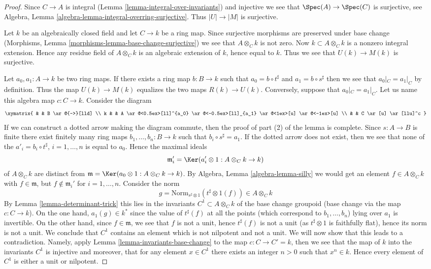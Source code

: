 \begin{proof}
Since $C \to A$ is integral (Lemma \ref{lemma-integral-over-invariants})
and injective we see that $\Spec(A) \to \Spec(C)$ is surjective, see
Algebra, Lemma \ref{algebra-lemma-integral-overring-surjective}.
Thus $|U| \to |M|$ is surjective.

\medskip\noindent
Let $k$ be an algebraically closed field and let $C \to k$ be a ring map.
Since surjective morphisms are preserved under base change
(Morphisms, Lemma \ref{morphisms-lemma-base-change-surjective})
we see that $A \otimes_C k$ is not zero. Now $k \subset A \otimes_C k$ is a
nonzero integral extension. Hence any residue field of $A \otimes_C k$
is an algebraic extension of $k$, hence equal to $k$. Thus we see that
$U(k) \to M(k)$ is surjective.

\medskip\noindent
Let $a_0, a_1 : A \to k$ be two ring maps. If there exists a ring map
$b : B \to k$ such that $a_0 = b \circ t^\sharp$ and $a_1 = b \circ s^\sharp$
then we see that $a_0|_C = a_1|_C$ by definition. Thus the map
$U(k) \to M(k)$ equalizes the two maps $R(k) \to U(k)$.
Conversely, suppose that $a_0|_C = a_1|_C$. Let us name this algebra
map $c : C \to k$. Consider the diagram
$$
\xymatrix{
& &
B \ar@{-->}[lld] \\
k & &
A
\ar@<0.5ex>[ll]^{a_0}
\ar@<-0.5ex>[ll]_{a_1}
\ar@<1ex>[u]
\ar@<-1ex>[u] \\
& &
C \ar[u] \ar[llu]^c
}
$$
If we can construct a dotted arrow making the diagram commute, then
the proof of part (2) of the lemma is complete. Since $s : A \to B$ is finite
there exist finitely many ring maps
$b_1, \ldots, b_n : B \to k$ such that $b_i \circ s^\sharp = a_1$.
If the dotted arrow does not exist, then we see that none of the
$a'_i = b_i \circ t^\sharp$, $i = 1, \ldots, n$ is equal to $a_0$.
Hence the maximal ideals
$$
\mathfrak m'_i = \Ker(a_i' \otimes 1 : A \otimes_C k \to k)
$$
of $A \otimes_C k$ are distinct from
$\mathfrak m = \Ker(a_0 \otimes 1 : A \otimes_C k \to k)$.
By Algebra, Lemma \ref{algebra-lemma-silly} we would get an element
$f \in A \otimes_C k$ with $f \in \mathfrak m$, but
$f \not \in \mathfrak m_i'$ for $i = 1, \ldots, n$.
Consider the norm
$$
g = \text{Norm}_{s^\sharp \otimes 1}(t^\sharp \otimes 1(f))
\in
A \otimes_C k
$$
By Lemma \ref{lemma-determinant-trick} this lies in the invariants
$C^1 \subset A \otimes_C k$ of the base change
groupoid (base change via the map $c : C \to k$). On the one hand,
$a_1(g) \in k^*$ since
the value of $t^\sharp(f)$ at all the points (which correspond to
$b_1, \ldots, b_n$) lying over $a_1$ is
invertible.
On the other hand, since $f \in \mathfrak m$, we see that
$f$ is not a unit, hence $t^\sharp(f)$ is not a unit
(as $t^\sharp \otimes 1$ is faithfully flat),
hence its norm is not a unit. We conclude that $C^1$ contains
an element which is not nilpotent
and not a unit. We will now show that this leads to a contradiction.
Namely, apply Lemma \ref{lemma-invariants-base-change}
to the map $c : C \to C' = k$, then
we see that the map of $k$ into the invariants $C^1$ is injective
and moreover, that for any element $x \in C^1$ there exists an integer
$n > 0$ such that $x^n \in k$. Hence every element of $C^1$ is
either a unit or nilpotent.


\end{proof}
